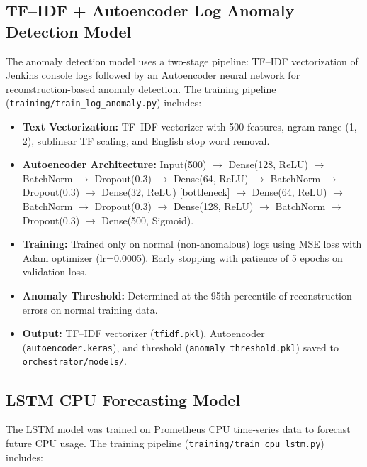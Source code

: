 \documentclass[12pt]{report}
\begin{document}
\subsection{TF--IDF + Autoencoder Log Anomaly Detection Model}

The anomaly detection model uses a two-stage pipeline: TF--IDF vectorization of Jenkins console logs followed by an Autoencoder neural network for reconstruction-based anomaly detection. The training pipeline (\texttt{training/train\_log\_anomaly.py}) includes:

\begin{itemize}
    \item \textbf{Text Vectorization:} TF--IDF vectorizer with 500 features, ngram range (1, 2), sublinear TF scaling, and English stop word removal.
    \item \textbf{Autoencoder Architecture:} Input(500) $\rightarrow$ Dense(128, ReLU) $\rightarrow$ BatchNorm $\rightarrow$ Dropout(0.3) $\rightarrow$ Dense(64, ReLU) $\rightarrow$ BatchNorm $\rightarrow$ Dropout(0.3) $\rightarrow$ Dense(32, ReLU) [bottleneck] $\rightarrow$ Dense(64, ReLU) $\rightarrow$ BatchNorm $\rightarrow$ Dropout(0.3) $\rightarrow$ Dense(128, ReLU) $\rightarrow$ BatchNorm $\rightarrow$ Dropout(0.3) $\rightarrow$ Dense(500, Sigmoid).
    \item \textbf{Training:} Trained only on normal (non-anomalous) logs using MSE loss with Adam optimizer (lr=0.0005). Early stopping with patience of 5 epochs on validation loss.
    \item \textbf{Anomaly Threshold:} Determined at the 95th percentile of reconstruction errors on normal training data.
    \item \textbf{Output:} TF--IDF vectorizer (\texttt{tfidf.pkl}), Autoencoder (\texttt{autoencoder.keras}), and threshold (\texttt{anomaly\_threshold.pkl}) saved to \texttt{orchestrator/models/}.
\end{itemize}

\subsection{LSTM CPU Forecasting Model}

The LSTM model was trained on Prometheus CPU time-series data to forecast future CPU usage. The training pipeline (\texttt{training/train\_cpu\_lstm.py}) includes:
\end{document}
